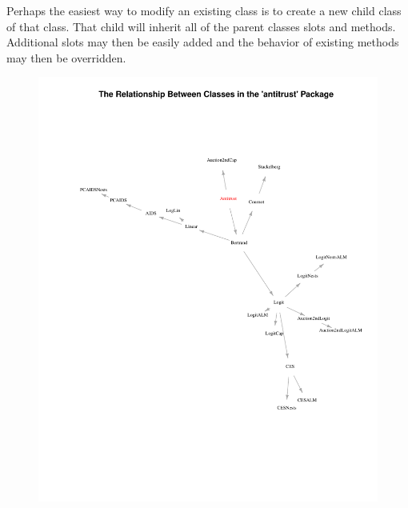 \documentclass[11pt,numbers=noenddot,pointlessnumbers]{scrreprt}
\numberwithin{equation}{section}
\begin{document}
Perhaps the easiest way to modify an existing class is to create a new
child class of that class. That child will inherit all of the parent classes
slots and methods. Additional slots may then be easily added and
the behavior of existing methods may then be overridden.




\begin{figure}[h]
 \caption{}
\includegraphics{ClassDiagram.pdf}
\label{fig:S4Classes}
\end{figure}




\printindex{}
\end{document}
